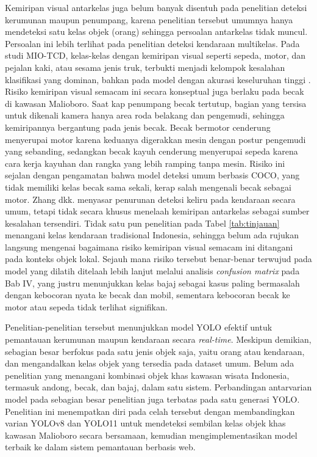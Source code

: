 Kemiripan visual antarkelas juga belum banyak disentuh pada penelitian deteksi kerumunan 
maupun penumpang, karena penelitian tersebut umumnya hanya mendeteksi satu kelas objek 
(orang) sehingga persoalan antarkelas tidak muncul. Persoalan ini lebih terlihat pada 
penelitian deteksi kendaraan multikelas. Pada studi MIO-TCD, kelas-kelas dengan kemiripan 
visual seperti sepeda, motor, dan pejalan kaki, atau sesama jenis truk, terbukti menjadi 
kelompok kesalahan klasifikasi yang dominan, bahkan pada model dengan akurasi keseluruhan 
tinggi \cite{luo2018miotcd}. Risiko kemiripan visual semacam ini secara konseptual juga 
berlaku pada becak di kawasan Malioboro. Saat kap penumpang becak tertutup, bagian yang 
tersisa untuk dikenali kamera hanya area roda belakang dan pengemudi, sehingga kemiripannya 
bergantung pada jenis becak. Becak bermotor cenderung menyerupai motor karena keduanya 
digerakkan mesin dengan postur pengemudi yang sebanding, sedangkan becak kayuh cenderung 
menyerupai sepeda karena cara kerja kayuhan dan rangka yang lebih ramping tanpa mesin. 
Risiko ini sejalan dengan pengamatan bahwa model deteksi umum berbasis COCO, yang tidak 
memiliki kelas becak sama sekali, kerap salah mengenali becak sebagai motor. Zhang dkk. 
\cite{zhang2022realtime} menyasar penurunan deteksi keliru pada kendaraan secara umum, 
tetapi tidak secara khusus menelaah kemiripan antarkelas sebagai sumber kesalahan 
tersendiri. Tidak satu pun penelitian pada Tabel \ref{tab:tinjauan} menangani kelas 
kendaraan tradisional Indonesia, sehingga belum ada rujukan langsung mengenai bagaimana 
risiko kemiripan visual semacam ini ditangani pada konteks objek lokal. Sejauh mana risiko 
tersebut benar-benar terwujud pada model yang dilatih ditelaah lebih lanjut melalui 
analisis \textit{confusion matrix} pada Bab IV, yang justru menunjukkan kelas bajaj 
sebagai kasus paling bermasalah dengan kebocoran nyata ke becak dan mobil, sementara 
kebocoran becak ke motor atau sepeda tidak terlihat signifikan.

Penelitian-penelitian tersebut menunjukkan model YOLO efektif untuk pemantauan kerumunan 
maupun kendaraan secara \textit{real-time}. Meskipun demikian, sebagian besar berfokus pada satu 
jenis objek saja, yaitu orang atau kendaraan, dan mengandalkan kelas objek yang tersedia 
pada dataset umum. Belum ada penelitian yang menangani kombinasi objek khas kawasan 
wisata Indonesia, termasuk andong, becak, dan bajaj, dalam satu sistem. Perbandingan 
antarvarian model pada sebagian besar penelitian juga terbatas pada satu generasi YOLO. 
Penelitian ini menempatkan diri pada celah tersebut dengan membandingkan varian YOLOv8 
dan YOLO11 untuk mendeteksi sembilan kelas objek khas kawasan Malioboro secara bersamaan, 
kemudian mengimplementasikan model terbaik ke dalam sistem pemantauan berbasis web.

